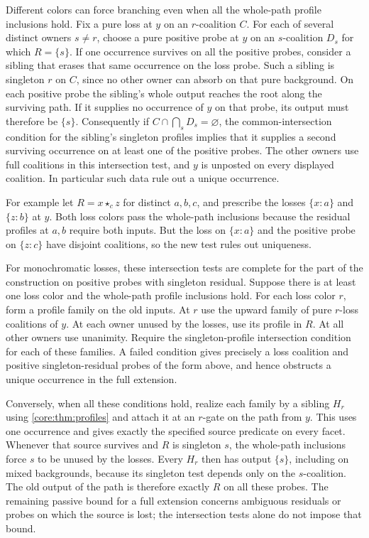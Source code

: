 Different colors can force branching even when all the
whole-path profile inclusions hold. Fix a pure loss at $y$
on an $r$-coalition $C$. For each of several distinct owners
$s\ne r$, choose a pure positive probe at $y$ on an $s$-coalition
$D_s$ for which $R=\{s\}$. If one occurrence survives on all
the positive probes, consider a sibling that erases that same
occurrence on the loss probe. Such a sibling is singleton $r$
on $C$, since no other owner can absorb on that pure background.
On each positive probe the sibling's whole output reaches the
root along the surviving path. If it supplies no occurrence
of $y$ on that probe, its output must therefore be $\{s\}$.
Consequently if $C\cap\bigcap_sD_s=\varnothing$, the
common-intersection condition for the sibling's singleton
profiles implies that it supplies a second surviving occurrence
on at least one of the positive probes. The other owners use
full coalitions in this intersection test, and $y$ is unposted
on every displayed coalition. In particular such data rule
out a unique occurrence.

For example let $R=x\star_c z$ for distinct $a,b,c$, and
prescribe the losses $\{x:a\}$ and $\{z:b\}$ at $y$. Both
loss colors pass the whole-path inclusions because the
residual profiles at $a,b$ require both inputs. But the loss
on $\{x:a\}$ and the positive probe on $\{z:c\}$ have
disjoint coalitions, so the new test rules out uniqueness.

For monochromatic losses, these intersection tests are complete
for the part of the construction on positive probes with singleton
residual. Suppose there is at least one loss color and the
whole-path profile inclusions hold. For each loss color $r$, form
a profile family on the old inputs. At $r$ use the upward family
of pure $r$-loss coalitions of $y$. At each owner unused by the
losses, use its profile in $R$. At all other owners use unanimity.
Require the singleton-profile intersection condition for each
of these families. A failed condition gives precisely a loss
coalition and positive singleton-residual probes of the form
above, and hence obstructs a unique occurrence in the full
extension.

Conversely, when all these conditions hold, realize each family
by a sibling $H_r$ using \cref{core:thm:profiles} and attach it
at an $r$-gate on the path from $y$. This uses one occurrence
and gives exactly the specified source predicate on every facet.
Whenever that source survives and $R$ is singleton $s$, the
whole-path inclusions force $s$ to be unused by the losses.
Every $H_r$ then has output $\{s\}$, including on mixed
backgrounds, because its singleton test depends only on the
$s$-coalition. The old output of the path is therefore exactly
$R$ on all these probes. The remaining passive bound for a full
extension concerns ambiguous residuals or probes on which the
source is lost; the intersection tests alone do not impose
that bound.

